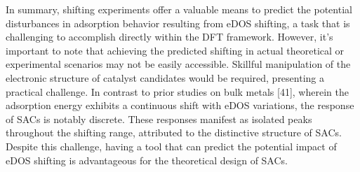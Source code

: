 In summary, shifting experiments offer a valuable means to predict the potential disturbances in adsorption behavior resulting from eDOS shifting, a task that is challenging to accomplish directly within the DFT framework.
However, it's important to note that achieving the predicted shifting in actual theoretical or experimental scenarios may not be easily accessible.
Skillful manipulation of the electronic structure of catalyst candidates would be required, presenting a practical challenge. In contrast to prior studies on bulk metals [41], wherein the adsorption energy exhibits a continuous shift with eDOS variations, the response of SACs is notably discrete.
These responses manifest as isolated peaks throughout the shifting range, attributed to the distinctive structure of SACs.
Despite this challenge, having a tool that can predict the potential impact of eDOS shifting is advantageous for the theoretical design of SACs.
